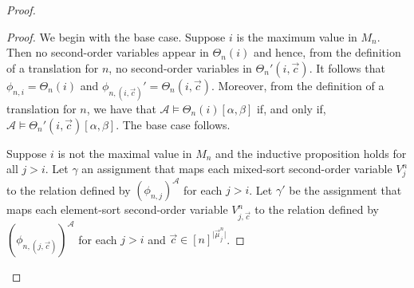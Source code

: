 \documentclass[../main/thesis.tex]{subfiles}
\begin{document}
\begin{proof}
\begin{proof}

    We begin with the base case. Suppose $i$ is the maximum value in $M_n$. Then
    no second-order variables appear in $\Theta_n(i)$ and hence, from the
    definition of a translation for $n$, no second-order variables in
    $\Theta_n'(i, \vec{c})$. It follows that $\phi_{n, i} = \Theta_n(i)$ and
    $\phi_{n, (i, \vec{c})}' = \Theta_{n}(i, \vec{c})$. Moreover, from the
    definition of a translation for $n$, we have that $\mathcal{A} \models
    \Theta_{n}(i)[\alpha, \beta]$ if, and only if, $\mathcal{A} \models
    \Theta_{n}'(i, \vec{c}) [\alpha, \beta]$. The base case follows.

    Suppose $i$ is not the maximal value in $M_n$ and the inductive proposition
    holds for all $j > i$. Let $\gamma$ an assignment that maps each mixed-sort
    second-order variable $V^n_j$ to the relation defined by $(\phi_{n,
      j})^{\mathcal{A}}$ for each $j > i$. Let $\gamma'$ be the assignment that
    maps each element-sort second-order variable $V^n_{j, \vec{c}}$ to the
    relation defined by $(\phi_{n, (j, \vec{c})})^{\mathcal{A}}$ for each $j >
    i$ and $\vec{c} \in [n]^{\vert \vec{\mu}^n_j \vert}$.


\end{proof}
\end{proof}
\end{document}
